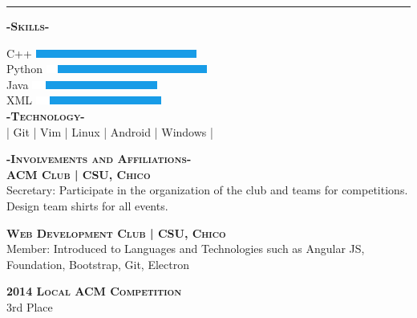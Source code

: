 \documentclass[12pt]{article}
\begin{document}
\noindent\rule{16.5cm}{0.4pt}
\bigskip
\begin{multicols}{2}
\begin{center}
\textbf{\textsc{-Skills-}}

\begin{small}
\end{small}
\flushleft
C++
\hfill
\includegraphics{C++Skill}\\
\smallskip
Python
\hfill
\includegraphics{PythonSkill}\\
\smallskip
Java
\hfill
\includegraphics{JavaSkill}\\
\smallskip
XML
\hfill
\includegraphics{JavaSkill}\\
\center
\textbf{\textsc{-Technology-}}\\
\smallskip
| Git | Vim | Linux | Android | Windows |

\end{center}

\columnbreak


\center
\footnotesize
\textbf{\textsc{-Involvements and Affiliations-}}\\
\smallskip
\color{black}\textsc{\textbf{ACM Club | CSU, Chico}}\\
\flushleft
\color{Cerulean}Secretary: \color{gray} Participate in the organization of the club and teams for competitions. Design team shirts for all events.

\center
\color{black}\textsc{\textbf{Web Development Club | CSU, Chico}}\\
\flushleft
\color{Cerulean}Member: \color{gray}Introduced to Languages and Technologies such as Angular JS, Foundation, Bootstrap, Git, Electron

\center
\color{black}
\textbf{\textsc{2014 Local ACM Competition}}\\
\medskip
3rd Place






\end{multicols}
\end{document}
